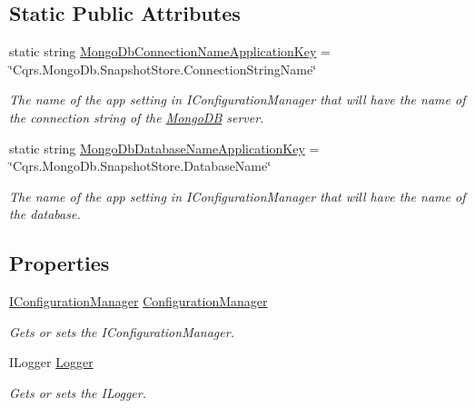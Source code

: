 \subsection*{Static Public Attributes}
\begin{DoxyCompactItemize}
\item 
static string \hyperlink{classCqrs_1_1MongoDB_1_1Events_1_1MongoDbSnapshotStoreConnectionStringFactory_a84a0a9bfa7319b87dde12633e2e0c364_a84a0a9bfa7319b87dde12633e2e0c364}{Mongo\+Db\+Connection\+Name\+Application\+Key} = \char`\"{}Cqrs.\+Mongo\+Db.\+Snapshot\+Store.\+Connection\+String\+Name\char`\"{}
\begin{DoxyCompactList}\small\item\em The name of the app setting in I\+Configuration\+Manager that will have the name of the connection string of the \hyperlink{namespaceCqrs_1_1MongoDB}{Mongo\+DB} server. \end{DoxyCompactList}\item 
static string \hyperlink{classCqrs_1_1MongoDB_1_1Events_1_1MongoDbSnapshotStoreConnectionStringFactory_a8aa88ef4e6b5d0d2608987ff6211d159_a8aa88ef4e6b5d0d2608987ff6211d159}{Mongo\+Db\+Database\+Name\+Application\+Key} = \char`\"{}Cqrs.\+Mongo\+Db.\+Snapshot\+Store.\+Database\+Name\char`\"{}
\begin{DoxyCompactList}\small\item\em The name of the app setting in I\+Configuration\+Manager that will have the name of the database. \end{DoxyCompactList}\end{DoxyCompactItemize}
\subsection*{Properties}
\begin{DoxyCompactItemize}
\item 
\hyperlink{interfaceCqrs_1_1Configuration_1_1IConfigurationManager}{I\+Configuration\+Manager} \hyperlink{classCqrs_1_1MongoDB_1_1Events_1_1MongoDbSnapshotStoreConnectionStringFactory_ae98d3531ef7434f0a60568f5a76c684c_ae98d3531ef7434f0a60568f5a76c684c}{Configuration\+Manager}
\begin{DoxyCompactList}\small\item\em Gets or sets the I\+Configuration\+Manager. \end{DoxyCompactList}\item 
I\+Logger \hyperlink{classCqrs_1_1MongoDB_1_1Events_1_1MongoDbSnapshotStoreConnectionStringFactory_a4ade446b5450b018598e501d53e59392_a4ade446b5450b018598e501d53e59392}{Logger}
\begin{DoxyCompactList}\small\item\em Gets or sets the I\+Logger. \end{DoxyCompactList}\end{DoxyCompactItemize}


